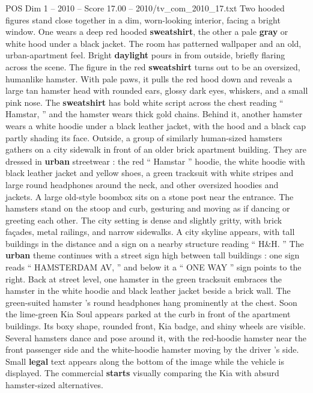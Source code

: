 \begin{textsample}{POS Dim 1 – 2010 – Score 17.00 – 2010/tv\_com\_2010\_17.txt}  \label{ex:f1_pos_024}
Two hooded figures stand close together in a dim, worn-looking interior, facing a bright window.
One wears a deep red hooded \textbf{sweatshirt}, the other a pale \textbf{gray} or white hood under a black jacket.
The room has patterned wallpaper and an old, urban-apartment feel.
Bright \textbf{daylight} pours in from outside, briefly flaring across the scene.
The figure in the red \textbf{sweatshirt} turns out to be an oversized, humanlike hamster.
With pale paws, it pulls the red hood down and reveals a large tan hamster head with rounded ears, glossy dark eyes, whiskers, and a small pink nose.
The \textbf{sweatshirt} has bold white script across the chest reading “ Hamstar, ” and the hamster wears thick gold chains.
Behind it, another hamster wears a white hoodie under a black leather jacket, with the hood and a black cap partly shading its face.
Outside, a group of similarly human-sized hamsters gathers on a city sidewalk in front of an older brick apartment building.
They are dressed in \textbf{urban} streetwear : the red “ Hamstar ” hoodie, the white hoodie with black leather jacket and yellow shoes, a green tracksuit with white stripes and large round headphones around the neck, and other oversized hoodies and jackets.
A large old-style boombox sits on a stone post near the entrance.
The hamsters stand on the stoop and curb, gesturing and moving as if dancing or greeting each other.
The city setting is dense and slightly gritty, with brick façades, metal railings, and narrow sidewalks.
A city skyline appears, with tall buildings in the distance and a sign on a nearby structure reading “ H\&H. ” The \textbf{urban} theme continues with a street sign high between tall buildings : one sign reads “ HAMSTERDAM AV, ” and below it a “ ONE WAY ” sign points to the right.
Back at street level, one hamster in the green tracksuit embraces the hamster in the white hoodie and black leather jacket beside a brick wall.
The green-suited hamster ’s round headphones hang prominently at the chest.
Soon the lime-green Kia Soul appears parked at the curb in front of the apartment buildings.
Its boxy shape, rounded front, Kia badge, and shiny wheels are visible.
Several hamsters dance and pose around it, with the red-hoodie hamster near the front passenger side and the white-hoodie hamster moving by the driver ’s side.
Small \textbf{legal} text appears along the bottom of the image while the vehicle is displayed.
The commercial \textbf{starts} visually comparing the Kia with absurd hamster-sized alternatives.

\end{textsample}
